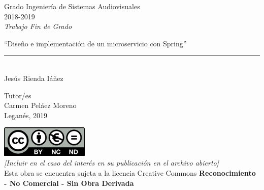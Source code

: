 \documentclass[12pt]{report} %
\begin{document}
	
\begin{titlepage}
	\begin{sffamily}
	\color{azulUC3M}
	\begin{center}
		\begin{figure}[H] %
		\end{figure}
		\vspace{2.5cm}
		\begin{Large}
			Grado Ingeniería de Sistemas Audiovisuales\\			
			2018-2019\\
			\vspace{2cm}		
			\textsl{Trabajo Fin de Grado}
			\bigskip
			
		\end{Large}
		 	{\Huge ``Diseño e implementación de un microservicio con Spring''}\\
		 	\vspace*{0.5cm}
	 		\rule{10.5cm}{0.1mm}\\
			\vspace*{0.9cm}
			{\LARGE Jesús Rienda Iáñez}\\ 
			\vspace*{1cm}
		\begin{Large}
			Tutor/es\\
			Carmen Peláez Moreno\\
			Leganés, 2019\\
		\end{Large}
	\end{center}
	\vfill
	\color{black}
	\includegraphics[width=4.2cm]{imagenes/creativecommons.png}\\
	\emph{[Incluir en el caso del interés en su publicación en el archivo abierto]}\\
	Esta obra se encuentra sujeta a la licencia Creative Commons \textbf{Reconocimiento - No Comercial - Sin Obra Derivada}
	\end{sffamily}
\end{titlepage}
\end{document}
